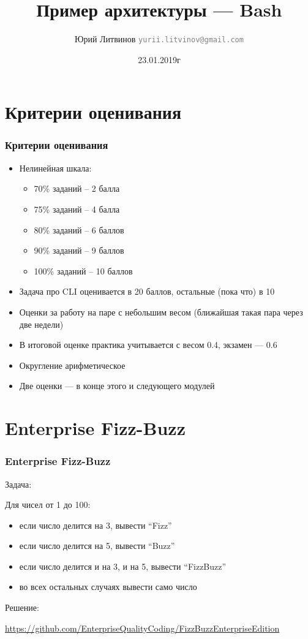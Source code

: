 \documentclass[xetex,mathserif,serif]{beamer}
\title{Пример архитектуры --- Bash}
\author[Юрий Литвинов]{Юрий Литвинов \newline \textcolor{gray}{\small\texttt{yurii.litvinov@gmail.com}}}
\date{23.01.2019г}
\begin{document}
	
	\frame{\titlepage}

	\section{Критерии оценивания}

	\begin{frame}
		\frametitle{Критерии оценивания}
		\begin{itemize}
			\item Нелинейная шкала:
			\begin{itemize}
				\item 70\% заданий -- 2 балла
				\item 75\% заданий -- 4 балла
				\item 80\% заданий -- 6 баллов
				\item 90\% заданий -- 9 баллов
				\item 100\% заданий -- 10 баллов
			\end{itemize}
			\item Задача про CLI оценивается в 20 баллов, остальные (пока что) в 10
			\item Оценки за работу на паре с небольшим весом (ближайшая такая пара через две недели)
			\item В итоговой оценке практика учитывается с весом 0.4, экзамен --- 0.6
			\item Округление арифметическое
			\item Две оценки --- в конце этого и следующего модулей
		\end{itemize}
	\end{frame}

	\section{Enterprise Fizz-Buzz}

	\begin{frame}
		\frametitle{Enterprise Fizz-Buzz}
		Задача:

		Для чисел от 1 до 100:
		\begin{itemize}
			\item если число делится на 3, вывести ``Fizz''
			\item если число делится на 5, вывести ``Buzz''
			\item если число делится и на 3, и на 5, вывести ``FizzBuzz''
			\item во всех остальных случаях вывести само число
		\end{itemize}

		Решение:

		\url{https://github.com/EnterpriseQualityCoding/FizzBuzzEnterpriseEdition}
	\end{frame}
\end{document}
